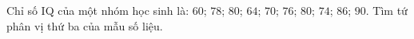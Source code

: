 \begin{ex}
Chỉ số IQ của một nhóm học sinh là: $60$; $78$; $80$; $64$; $70$; $76$; $80$; $74$; $86$; $90$. Tìm tứ phân vị thứ ba của mẫu số liệu.
\end{ex}
